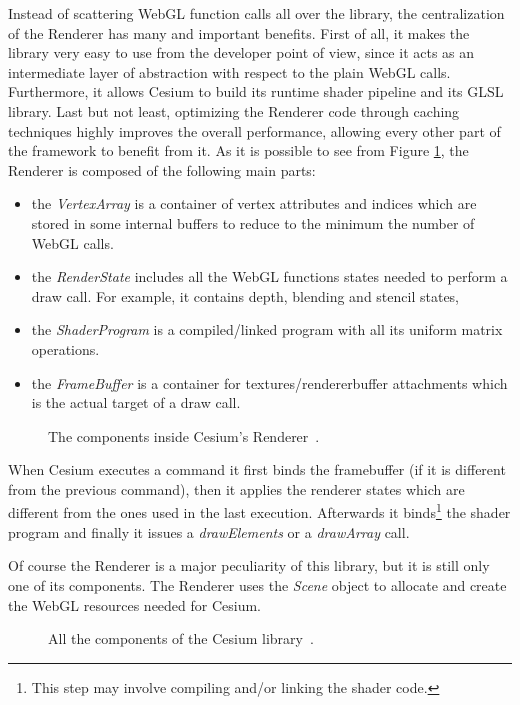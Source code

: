 Instead of scattering WebGL function calls all over the library, the centralization
of the Renderer has many and important benefits. First of all, it makes the
library very easy to use from the developer point of view, since it acts as an
intermediate layer of abstraction with respect to the plain WebGL calls. Furthermore,
it allows Cesium to build its runtime shader pipeline and its GLSL library. Last
but not least, optimizing the Renderer code through caching techniques
highly improves the overall performance, allowing every other part of the framework to
benefit from it. As it is possible to see from Figure \ref{img:cesium_renderer},
the Renderer is composed of the following main parts:
\begin{itemize}
    \item the \emph{VertexArray} is a container of vertex attributes and indices
        which are stored in some internal buffers to reduce to the minimum the
        number of WebGL calls.
    \item the \emph{RenderState} includes all the WebGL functions states needed to
        perform a draw call. For example, it contains depth, blending and stencil
        states,
    \item the \emph{ShaderProgram} is a compiled/linked program with all its
        uniform matrix operations.
    \item the \emph{FrameBuffer} is a container for textures/rendererbuffer
        attachments which is the actual target of a draw call.
\end{itemize}

\begin{figure}[!htb]
    \caption{The components inside Cesium's Renderer~\cite{fig_cesium_renderer}.}
    \label{img:cesium_renderer}
\end{figure}

When Cesium executes a command it first binds the framebuffer (if it is different
from the previous command), then it applies the renderer states which are different
from the ones used in the last execution. Afterwards it binds\footnote{This step may
involve compiling and/or linking the shader code.} the shader program and finally it
issues a \emph{drawElements} or a \emph{drawArray} call.

Of course the Renderer is a major peculiarity of this library, but it is still only
one of its components. The Renderer uses the \emph{Scene} object to allocate and
create the WebGL resources needed for Cesium.
\begin{figure}[!htb]
    \caption{All the components of the Cesium library~\cite{fig_cesium_renderer}.}
    \label{img:cesium_stack}
\end{figure}

